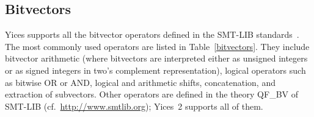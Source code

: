 \documentclass[11pt,twoside,fleqn,openright,titlepage]{cslreport}
\begin{document}
\subsection{Bitvectors}
\label{bitvector-general}

Yices supports all the bitvector operators defined in the SMT-LIB
standards~\cite{SMTLIB12:2006,SMTLIB20:2012}.  The most commonly used
operators are listed in Table~\ref{bitvectors}.  They include
bitvector arithmetic (where bitvectors are interpreted either as
unsigned integers or as signed integers in two's complement
representation), logical operators such as bitwise OR or AND, logical
and arithmetic shifts, concatenation, and extraction of
subvectors. Other operators are defined in the theory QF\_BV of
SMT-LIB (cf.~\url{http://www.smtlib.org}); Yices~2 supports all of them.
\end{document}
